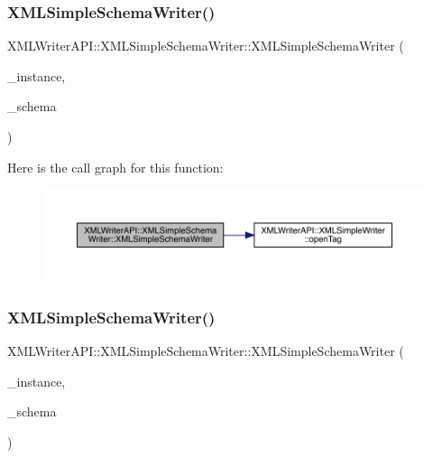 \subsubsection{\texorpdfstring{XMLSimpleSchemaWriter()}{XMLSimpleSchemaWriter()}\hspace{0.1cm}{\footnotesize\ttfamily [1/3]}}
{\footnotesize\ttfamily X\+M\+L\+Writer\+A\+P\+I\+::\+X\+M\+L\+Simple\+Schema\+Writer\+::\+X\+M\+L\+Simple\+Schema\+Writer (\begin{DoxyParamCaption}\item[{\mbox{\hyperlink{classXMLWriterAPI_1_1XMLSimpleWriter}{X\+M\+L\+Simple\+Writer}} \&}]{\+\_\+instance,  }\item[{\mbox{\hyperlink{classXMLWriterAPI_1_1XMLSimpleWriter}{X\+M\+L\+Simple\+Writer}} \&}]{\+\_\+schema }\end{DoxyParamCaption})\hspace{0.3cm}{\ttfamily [inline]}}

Here is the call graph for this function\+:
\nopagebreak
\begin{figure}[H]
\begin{center}
\leavevmode
\includegraphics[width=350pt]{db/d0b/classXMLWriterAPI_1_1XMLSimpleSchemaWriter_a309425b6927188991ba8fb9d19e0caca_cgraph}
\end{center}
\end{figure}
\mbox{\label{classXMLWriterAPI_1_1XMLSimpleSchemaWriter_a309425b6927188991ba8fb9d19e0caca}} 
\subsubsection{\texorpdfstring{XMLSimpleSchemaWriter()}{XMLSimpleSchemaWriter()}\hspace{0.1cm}{\footnotesize\ttfamily [2/3]}}
{\footnotesize\ttfamily X\+M\+L\+Writer\+A\+P\+I\+::\+X\+M\+L\+Simple\+Schema\+Writer\+::\+X\+M\+L\+Simple\+Schema\+Writer (\begin{DoxyParamCaption}\item[{\mbox{\hyperlink{classXMLWriterAPI_1_1XMLSimpleWriter}{X\+M\+L\+Simple\+Writer}} \&}]{\+\_\+instance,  }\item[{\mbox{\hyperlink{classXMLWriterAPI_1_1XMLSimpleWriter}{X\+M\+L\+Simple\+Writer}} \&}]{\+\_\+schema }\end{DoxyParamCaption})\hspace{0.3cm}{\ttfamily [inline]}}


